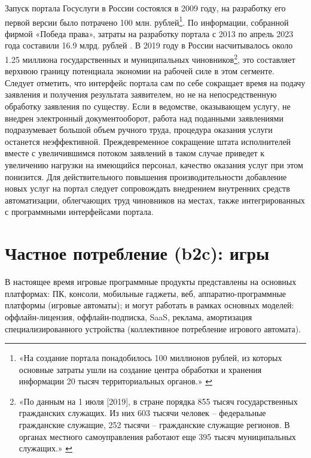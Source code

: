 \documentclass{article}
\begin{document}
Запуск портала Госуслуги в России состоялся в 2009 году, на разработку его первой версии было потрачено 100 млн. рублей\footnote{«На создание портала понадобилось 100 миллионов рублей, из которых основные затраты ушли на создание центра обработки и хранения информации 20 тысяч территориальных органов.» \cite{gosuslugiLaunch2009}}. По информации, собранной фирмой «Победа права», затраты на разработку портала с 2013 по апрель 2023 года составили 16.9 млрд. рублей \cite{gosuslugiDevCostEstimate2023}. В 2019 году в России насчитывалось около 1.25 миллиона государственных и муниципальных чиновников\footnote{«По данным на 1 июля [2019], в стране порядка 855 тысяч государственных гражданских служащих. Из них 603 тысячи человек – федеральные гражданские служащие, 252 тысячи – гражданские служащие регионов. В органах местного самоуправления работают еще 395 тысяч муниципальных служащих.» \cite{minfinNumberOfOfficials2019}}, это составляет верхнюю границу потенциала экономии на рабочей силе в этом сегменте. Следует отметить, что интерфейс портала сам по себе сокращает время на подачу заявления и получения результата заявителем, но не на непосредственную обработку заявления по существу. Если в ведомстве, оказывающем услугу, не внедрен электронный документооборот, работа над поданными заявлениями подразумевает большой объем ручного труда, процедура оказания услуги останется неэффективной. Преждевременное сокращение штата исполнителей вместе с увеличившимся потоком заявлений в таком случае приведет к увеличению нагрузки на имеющийся персонал, качество оказания услуг при этом понизится. Для действительного повышения производительности добавление новых услуг на портал следует сопровождать внедрением внутренних средств автоматизации, облегчающих труд чиновников на местах, также интегрированных с программными интерфейсами портала.

\section*{Частное потребление (b2c): игры}

В настоящее время игровые программные продукты представлены на основных платформах: ПК, консоли, мобильные гаджеты, веб, аппаратно-программные платформы (игровые автоматы); и могут работать в рамках основных моделей: оффлайн-лицензия, оффлайн-подписка, SaaS, реклама, амортизация специализированного устройства (коллективное потребление игрового автомата).
\end{document}
